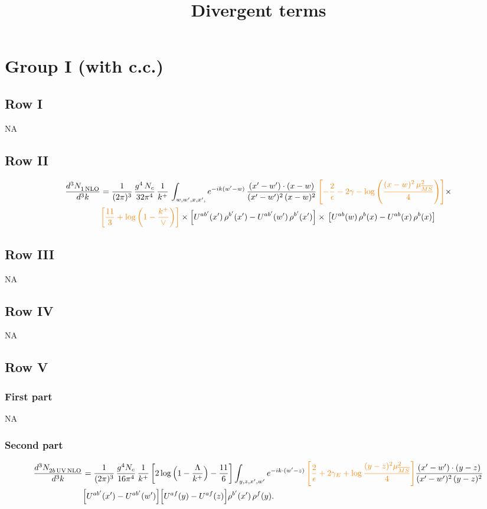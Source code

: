 \documentclass[9pt]{article}
\title{Divergent terms}
\author{}
\date{}
\numberwithin{equation}{section}
\begin{document}
\maketitle
\section{Group I (with c.c.)}
\subsection{Row I}
\textsc{NA}
\subsection{Row II}
\begin{align}
     \frac{d^{3}N_{1\,\rm NLO}^{\rm}}{d^{3}k} &  =  \frac{1}{(2\pi)^{3}}\, \frac{g^{4}\,N_{c}}{32\pi^{4}}\,\frac{1}{k^{+}}\, \int_{w, w',x,x',} e^{-ik(w^\prime-w)}\, \frac{(x'-w')\cdot (x-w)}{(x'-w')^{2}\, (x-w)^{2}}\, {\color{orange}\left[-\frac{2}{\epsilon}-2\gamma-\log{\left(\frac{(x-w)^{2}\,\mu^{2}_{\overline{MS}}}{4}\right)}\right]}\times \notag \\ & {\color{orange}\left[\frac{11}{3}+\log{\left(1-\frac{k^{+}}{\vee}\right)}\right]}\times \left[U^{ab'}(x')\,\rho^{b'}(x') - U^{ab'}(w')\,\rho^{b'}(x')\right]\times\,\left[U^{ab}(w)\,\rho^{b}(x) - U^{ab}(x)\,\rho^{b}(x)\right]
\end{align}
\subsection{Row III}
\textsc{NA}
\subsection{Row IV}
\textsc{NA}
\subsection{Row V}
\subsubsection*{First part}
\textsc{NA}
\subsubsection*{Second part}
\begin{align}
\frac{d^{3}N_{2b\,\rm UV\, NLO}^{\rm}}{d^{3}k} & = \frac{1}{(2\pi)^{3}}\,\frac{g^{4}N_{c}}{16\pi^{4}}\,\frac{1}{k^{+}}
\left[2\log\Big(1-\frac{\Lambda}{k^{+}}\Big)-\frac{11}{6}\right]\int_{y,z,x',w'}e^{-ik\cdot(w'-z)}\, {\color{orange}\left[\frac{2}{\epsilon}+2\gamma_{E}+\log\frac{(y-z)^{2}\mu^{2}_{\overline{MS}}}{4}\right]}
\frac{(x'-w')\cdot(y-z)}{(x'-w')^{2}\,(y-z)^{2}}\notag \\ &  \Big[U^{ab'}(x')-U^{ab'}(w')\Big]\Big[U^{af}(y)-U^{af}(z)\Big]\rho^{b'}(x')\,\rho^{f}(y).
\end{align}
\end{document}
